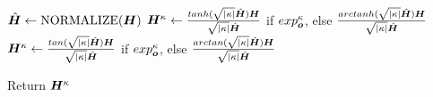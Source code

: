 \IncMargin{1em}
\vspace{-2mm}
\begin{algorithm}

\caption{$exp_{\vect{o}}^{\kappa}$/$log_{\vect{o}}^{\kappa}$}\label{alg:exp-log}
$\hat{\boldsymbol{H}} \leftarrow \text{NORMALIZE}(\boldsymbol{H})$\;
 {
    $\boldsymbol{H}^\kappa \leftarrow \frac{tanh(\sqrt{|\kappa|}\hat{\boldsymbol{H}})\boldsymbol{H}}{\sqrt{|\kappa|}\hat{\boldsymbol{H}}}$ if $exp_{\vect{o}}^{\kappa}$, else  $\frac{arctanh(\sqrt{|\kappa|}\hat{\boldsymbol{H}})\boldsymbol{H}}{\sqrt{|\kappa|}\hat{\boldsymbol{H}}}$\;
}
 {
    $\boldsymbol{H}^\kappa \leftarrow \frac{tan(\sqrt{|\kappa|}\hat{\boldsymbol{H}})\boldsymbol{H}}{\sqrt{|\kappa|}\hat{\boldsymbol{H}}}$  if $exp_{\vect{o}}^{\kappa}$, else  $\frac{arctan(\sqrt{|\kappa|}\hat{\boldsymbol{H}})\boldsymbol{H}}{\sqrt{|\kappa|}\hat{\boldsymbol{H}}}$\;
}

Return $\boldsymbol{H}^\kappa$\;

\end{algorithm}
\vspace{-2mm}
\DecMargin{1em}